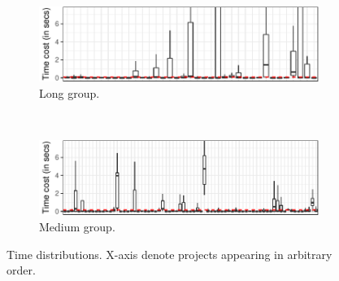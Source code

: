 \begin{figure}[h]
    \centering
    \begin{subfigure}{0.47\textwidth}
      \centering
      \includegraphics[width=\textwidth]{results/testcost-long.pdf}
      \caption{\label{fig:longtcost}Long group.}
    \end{subfigure}\\
    \vspace{2ex}
    \begin{subfigure}{0.47\textwidth}
      \centering
      \includegraphics[width=\textwidth]{results/testcost-medium.pdf}
      \caption{\label{fig:medtcost}Medium group.}
    \end{subfigure}
    \caption{\label{fig:time-distributions}Time distributions. X-axis
        denote projects appearing in arbitrary order.}%
\end{figure}

